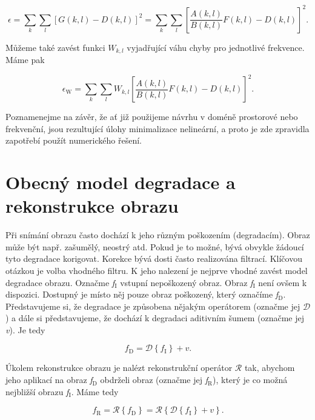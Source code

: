 \begin{equation} \label{eq:5_37}
    \epsilon = \sum\limits_{k} \sum\limits_{l} \left[ G(k, l) - D(k, l) \right]^2 = \sum\limits_{k} \sum\limits_{l} \left[ \frac{A(k, l)}{B(k, l)} F(k, l) - D(k, l) \right]^2.
\end{equation}

Můžeme také zavést funkci $W_{k, l}$ vyjadřující váhu chyby pro jednotlivé frekvence. Máme pak

\begin{equation} \label{eq:5_38}
    \epsilon_\mathrm{W} = \sum\limits_{k} \sum\limits_{l} W_{k, l} \left[ \frac{A(k, l)}{B(k, l)} F(k, l) - D(k, l) \right]^2.
\end{equation}

Poznamenejme na závěr, že ať již použijeme návrhu v doméně prostorové nebo frekvenční, jsou rezultující úlohy minimalizace nelineární, a proto je zde zpravidla zapotřebí použít numerického řešení.

\section*{Obecný model degradace a rekonstrukce obrazu}

Při snímání obrazu často dochází k jeho různým poškozením (degradacím). Obraz může být např. zašumělý, neostrý atd. Pokud je to možné, bývá obvykle žádoucí tyto degradace korigovat. Korekce bývá dosti často realizována filtrací. Klíčovou otázkou je volba vhodného filtru. K jeho nalezení je nejprve vhodné zavést model degradace obrazu. Označme \textit{f}$_\mathrm{I}$ vstupní nepoškozený obraz. Obraz \textit{f}$_\mathrm{I}$ není ovšem k dispozici. Dostupný je místo něj pouze obraz poškozený, který označíme \textit{f}$_\mathrm{D}$. Představujeme si, že degradace je způsobena nějakým operátorem (označme jej $\mathscr{D}$) a dále si představujeme, že dochází k degradaci aditivním šumem (označme jej \textit{v}). Je tedy

\begin{equation} \label{eq:5_39}
    f_\mathrm{D} = \mathscr{D} \left\{ f_\mathrm{I} \right\} + v.
\end{equation}

Úkolem rekonstrukce obrazu je nalézt rekonstrukční operátor $\mathscr{R}$ tak, abychom jeho aplikací na obraz \textit{f}$_\mathrm{D}$ obdrželi obraz (označme jej \textit{f}$_\mathrm{R}$), který je co možná nejbližší obrazu \textit{f}$_\mathrm{I}$. Máme tedy

\begin{equation} \label{eq:5_40}
    f_\mathrm{R} = \mathscr{R} \left\{ f_\mathrm{D} \right\} = \mathscr{R} \left\{ \mathscr{D} \left\{ f_\mathrm{I} \right\} + v \right\}.
\end{equation}

